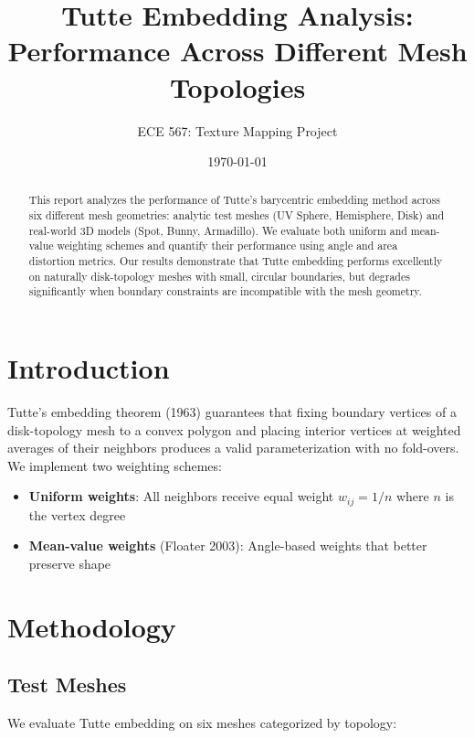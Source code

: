 \documentclass[11pt]{article}
\title{Tutte Embedding Analysis: \\
Performance Across Different Mesh Topologies}
\author{ECE 567: Texture Mapping Project}
\date{\today}
\begin{document}
\maketitle

\begin{abstract}
This report analyzes the performance of Tutte's barycentric embedding method across six different mesh geometries: analytic test meshes (UV Sphere, Hemisphere, Disk) and real-world 3D models (Spot, Bunny, Armadillo). We evaluate both uniform and mean-value weighting schemes and quantify their performance using angle and area distortion metrics. Our results demonstrate that Tutte embedding performs excellently on naturally disk-topology meshes with small, circular boundaries, but degrades significantly when boundary constraints are incompatible with the mesh geometry.
\end{abstract}

\section{Introduction}

Tutte's embedding theorem (1963) guarantees that fixing boundary vertices of a disk-topology mesh to a convex polygon and placing interior vertices at weighted averages of their neighbors produces a valid parameterization with no fold-overs. We implement two weighting schemes:

\begin{itemize}
    \item \textbf{Uniform weights}: All neighbors receive equal weight $w_{ij} = 1/n$ where $n$ is the vertex degree
    \item \textbf{Mean-value weights} (Floater 2003): Angle-based weights that better preserve shape
\end{itemize}

\section{Methodology}

\subsection{Test Meshes}

We evaluate Tutte embedding on six meshes categorized by topology:
\end{document}

